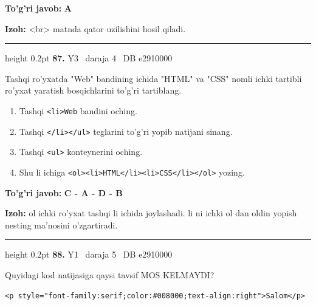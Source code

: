 \documentclass[10pt,a4paper,oneside]{article}
\begin{document}
\begin{tcolorbox}[enhanced,breakable,colback=teal!4,colframe=teal!45!black,boxrule=0.45pt,arc=1.2mm,left=2.8mm,right=2.8mm,top=2mm,bottom=2mm,before skip=2mm,after skip=2mm]
\textbf{\color{teal}To'g'ri javob:} \textbf{A}
\par\smallskip
\textbf{Izoh:} \textless{}br\textgreater{} matnda qator uzilishini hosil qiladi.
\end{tcolorbox}
\vspace{2mm}\hrule height 0.2pt \vspace{4mm}
\hypertarget{q87}{\textbf{\color{ink}87.}}  {\color{muted}\scriptsize Y3 \textbullet\ daraja 4 \textbullet\ DB e2910000}
\par
Tashqi ro'yxatda "Web" bandining ichida "HTML" va "CSS" nomli ichki tartibli ro'yxat yaratish bosqichlarini to'g'ri tartiblang.
\begin{enumerate}[label=\Alph*),leftmargin=9mm]
\item Tashqi \texttt{\textless{}li\textgreater{}Web} bandini oching.
\item Tashqi \texttt{\textless{}/li\textgreater{}\textless{}/ul\textgreater{}} teglarini to'g'ri yopib natijani sinang.
\item Tashqi \texttt{\textless{}ul\textgreater{}} konteynerini oching.
\item Shu li ichiga \texttt{\textless{}ol\textgreater{}\textless{}li\textgreater{}HTML\textless{}/li\textgreater{}\textless{}li\textgreater{}CSS\textless{}/li\textgreater{}\textless{}/ol\textgreater{}} yozing.
\end{enumerate}
\begin{tcolorbox}[enhanced,breakable,colback=teal!4,colframe=teal!45!black,boxrule=0.45pt,arc=1.2mm,left=2.8mm,right=2.8mm,top=2mm,bottom=2mm,before skip=2mm,after skip=2mm]
\textbf{\color{teal}To'g'ri javob:} \textbf{C - A - D - B}
\par\smallskip
\textbf{Izoh:} ol ichki ro'yxat tashqi li ichida joylashadi. li ni ichki ol dan oldin yopish nesting ma'nosini o'zgartiradi.
\end{tcolorbox}
\vspace{2mm}\hrule height 0.2pt \vspace{4mm}
\hypertarget{q88}{\textbf{\color{ink}88.}}  {\color{muted}\scriptsize Y1 \textbullet\ daraja 5 \textbullet\ DB e2910000}
\par
Quyidagi kod natijasiga qaysi tavsif MOS KELMAYDI?\par
\begin{lstlisting}
<p style="font-family:serif;color:#008000;text-align:right">Salom</p>
\end{lstlisting}
\end{document}
